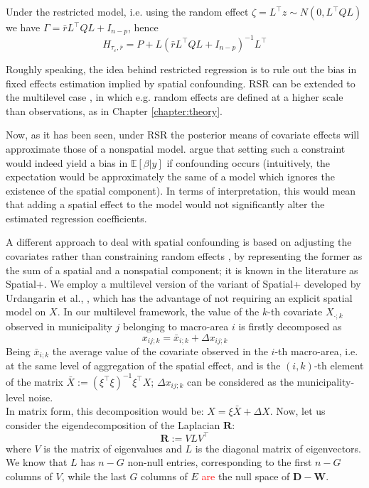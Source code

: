 \documentclass[openany]{book}
\begin{document}
Under the restricted model, i.e. using the random effect $\zeta = L^{\top}z \sim N(0, L^{\top}QL)$ we have $\Gamma = \bar{r} L^{\top}QL + I_{n-p}$, hence 
$$
H_{\tau_{\varepsilon}, \bar{r}} 
= P + L (\bar{r} L^{\top}QL + I_{n-p})^{-1} L^{\top}
$$
 
Roughly speaking, the idea behind restricted regression is to rule out the bias in fixed effects estimation implied by spatial confounding. RSR can be extended to the multilevel case \cite{Nobre}, in which e.g. random effects are defined at a higher scale than observations, as in Chapter \ref{chapter:theory}.

Now, as it has been seen, under RSR the posterior means of covariate effects will approximate those of a nonspatial model. \cite{DupontArXiv} argue that setting such a constraint would indeed yield a bias in $\mathbb{E}[\beta |y]$ if confounding occurs (intuitively, the expectation would be approximately the same of a model which ignores the existence of the spatial component). In terms of interpretation, this would mean that adding a spatial effect to the model would not significantly alter the estimated regression coefficients.


A different approach to deal with spatial confounding is based on adjusting the covariates rather than constraining random effects \cite{Dupont}, by representing the former as the sum of a spatial and a nonspatial component; it is known in the literature as Spatial+. We employ a multilevel version of the variant of Spatial+ developed by Urdangarin et al., \cite{Urdangarin24}, which has the advantage of not requiring an explicit spatial model on $X$. In our multilevel framework, the value of the $k$-th covariate $X_{\cdot; k}$ observed in municipality $j$ belonging to macro-area $i$ is firstly decomposed as
$$
x_{ij;k} = \bar{x}_{i;k} + \Delta x_{ij;k}
$$
Being $\bar{x}_{i;k}$ the average value of the covariate observed in the $i$-th macro-area, i.e. at the same level of aggregation of the spatial effect, and is the $(i, k)$-th element of the matrix $\bar{X}:=(\xi^{\top}\xi)^{-1}\xi^{\top}X$; $\Delta x_{ij;k}$ can be considered as the municipality-level noise. \\In matrix form, this decomposition would be: $X = \xi \bar{X} + \Delta X$. Now, let us consider the eigendecomposition of the Laplacian $\mathbf{R}$:
$$
\mathbf{R} := VLV^{\top}
$$ where $V$ is the matrix of eigenvalues and $L$ is the diagonal matrix of eigenvectors. We know that $L$ has $n-G$ non-null entries, corresponding to the first $n-G$ columns of $V$, while the last $G$ columns of $E$ \textcolor{red}{are} the null space of $\mathbf{D} - \mathbf{W}$.  
\end{document}
